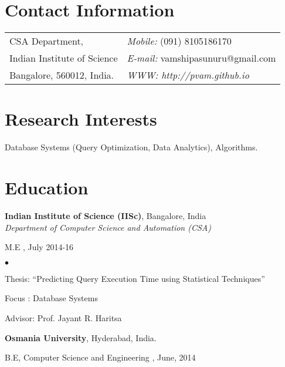 \documentclass[margin,line]{res}
\newenvironment{list1}{
  \begin{list}{\ding{113}}{%
      \setlength{\itemsep}{0in}
      \setlength{\parsep}{0in} \setlength{\parskip}{0in}
      \setlength{\topsep}{0in} \setlength{\partopsep}{0in} 
      \setlength{\leftmargin}{0.17in}}}{\end{list}}
\newenvironment{list2}{
  \begin{list}{$\bullet$}{%
      \setlength{\itemsep}{0in}
      \setlength{\parsep}{0in} \setlength{\parskip}{0in}
      \setlength{\topsep}{0in} \setlength{\partopsep}{0in} 
      \setlength{\leftmargin}{0.2in}}}{\end{list}}
\begin{document}

\begin{resume}
\section{\sc Contact Information}
\vspace{.05in}
\begin{tabular}{@{}p{3in}p{4in}}
CSA Department,             & {\it Mobile:}  (091) 8105186170 \\            
Indian Institute of Science & {\it E-mail:}  vamshipasunuru@gmail.com\\       
Bangalore, 560012, India.  & {\it WWW: http://pvam.github.io} \\     
\end{tabular}


\section{\sc Research Interests}

Database Systems (Query Optimization, Data Analytics), Algorithms.

\section{\sc Education}
{\bf Indian Institute of Science (IISc)}, Bangalore, India\\
{\em Department of Computer Science and Automation (CSA)} 
\begin{list1}
\item[]  M.E , July 2014-16
\begin{list2}
\vspace*{.05in}
\item Thesis:  ``Predicting Query Execution Time using Statistical Techniques'' 
\item Focus : Database Systems
\item Advisor:  Prof. Jayant R. Haritsa
\end{list2}
\end{list1}

{\bf Osmania University}, Hyderabad, India.\\
\begin{list1}
\item[] B.E, Computer Science and Engineering ,  June, 2014
\end{list1}

\end{resume}
\end{document}
